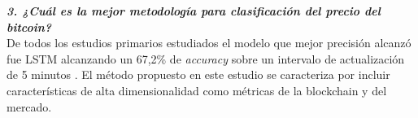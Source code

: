 \textbf{\textit{3. ¿Cuál es la mejor metodología para clasificación del precio del bitcoin?}}\\
De todos los estudios primarios estudiados el modelo que mejor precisión alcanzó fue LSTM alcanzando un 67,2\% de \textit{accuracy} sobre un intervalo de actualización de 5 minutos \parencite{chenBitcoinPricePrediction2020}. El método propuesto en este estudio se caracteriza por incluir características de alta dimensionalidad como métricas de la blockchain y del mercado.\\






